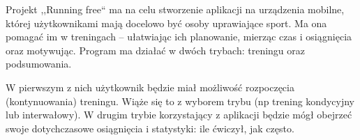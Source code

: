 \nopagebreak
Projekt ,,Running free`` ma na celu stworzenie aplikacji na urządzenia mobilne, której użytkownikami mają docelowo być osoby uprawiające sport. Ma ona pomagać im w treningach -- ułatwiając ich planowanie, mierząc czas i osiągnięcia oraz motywując. 
Program ma działać w dwóch trybach: treningu oraz podsumowania.

W pierwszym z nich użytkownik będzie miał możliwość rozpoczęcia (kontynuowania) treningu. Wiąże się to z wyborem trybu (np trening kondycyjny lub interwałowy).
W drugim trybie korzystający z aplikacji będzie mógł obejrzeć swoje dotychczasowe osiągnięcia i statystyki: ile ćwiczył, jak często. 

